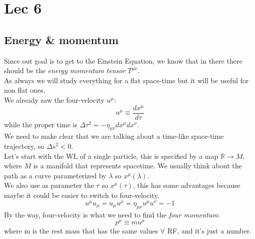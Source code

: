 \section{Lec 6}
\subsection{Energy \& momentum}
Since out goal is to get to the Einstein Equation, we know that in there there should be the \emph{energy momentum tensor} $T^{\mu \nu }$. \\
As always we will study everything for a flat space-time but it will be useful for non flat ones. \\
We already saw the four-velocity $u^{\mu}$:
\[
u^{\mu } \equiv \frac{d x^{\mu }}{d\tau }
\]
while the proper time is $\Delta \tau^{2} = - \eta_{\mu \nu }dx^{\mu }dx^{\nu }$. \\
We need to make clear that we are talking about a time-like space-time trajectory, so $\Delta s^{2}<0$. \\
Let's start with the WL of a single particle, this is specified by a map $\mathbb{R}\to M$, where $M$ is a manifold that represents spacetime. We usually think about the path as a curve parameterized by $\lambda $ so $x^{\mu }\left( \lambda  \right)$. \\
We also use as parameter the $\tau $ so $x^{\mu }\left( \tau  \right)$, this has some advantages because maybe it could be easier to switch to four-velocity.
\begin{equation}
u^{\mu }u_{\mu } = u_{\mu }u^{\mu } = \eta_{\mu \nu } u^{\mu }u^{\nu } = -1
\end{equation}
By the way, four-velocity is what we need to find the \emph{four momentum}:
\begin{equation}
p^{\mu } \equiv m u^{\mu }
\end{equation}
where m is the rest mass that has the same values $\forall$ RF, and it's just a number.


